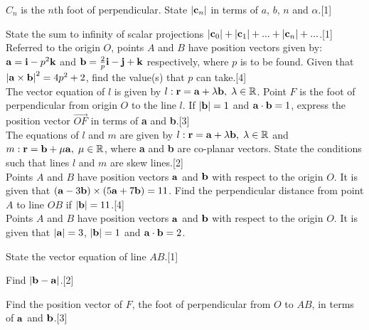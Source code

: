 \documentclass[12pt, a4 paper]{article}
\begin{document}
\begin{outline}[enumerate]
	\2 ${C_n}$ is the $n$th foot of perpendicular. State $\left| {{{\bf{c}}_n}} \right|$ in terms of $a$, $b$, $n$ and $\alpha$.\hfill[1]
		
	\2 State the sum to infinity of scalar projections $\left| {{{\bf{c}}_0}} \right| + \left| {{{\bf{c}}_1}} \right| + ... + \left| {{{\bf{c}}_n}} \right| + ...$.\hfill[1]\\
	
	\1 Referred to the origin $O$, points $A$ and $B$ have position vectors given by: ${\bf{a}} = {\bf{i}} - {p^2}{\bf{k}}$ and ${\bf{b}} = \frac{2}{p}{\bf{i}} - {\bf{j}} + {\bf{k}}$ respectively, where $p$ is to be found. Given that ${\left| {{\bf{a}} \times {\bf{b}}} \right|^2} = 4{p^2} + 2$, find the value(s) that $p$ can take.\hfill[4]\\
	
	\1 The vector equation of $l$ is given by $l:{\bf{r}} = {\bf{a}} + \lambda {\bf{b}},\;\lambda  \in \mathbb{R}$. Point $F$ is the foot of perpendicular from origin $O$ to the line $l$. If $\left| {\bf{b}} \right| = 1$ and ${\bf{a}} \cdot {\bf{b}} = 1$, express the position vector $\overrightarrow {OF}$ in terms of \textbf{a} and \textbf{b}.\hfill[3]\\
	
	\1 The equations of $l$ and $m$ are given by $l:{\bf{r}} = {\bf{a}} + \lambda {\bf{b}},\;\lambda  \in \mathbb{R}$ and $m:{\bf{r}} = {\bf{b}} + \mu {\bf{a}},\;\mu  \in \mathbb{R}$, where \textbf{a} and \textbf{b} are co-planar vectors. State the conditions such that lines $l$ and $m$ are skew lines.\hfill[2]\\
		
	\1 Points $A$ and $B$ have position vectors $\bf{a}$ and $\bf{b}$ with respect to the origin $O$. It is given that $({\bf{a}} - 3{\bf{b}}) \times (5{\bf{a}} + 7{\bf{b}}) = 11$. Find the perpendicular distance from point $A$ to line $OB$ if $\left| {\bf{b}} \right| = 11$.\hfill[4]\\
	
	\1 Points $A$ and $B$ have position vectors $\bf{a}$ and $\bf{b}$ with respect to the origin $O$. It is given that $\left| {\bf{a}} \right| = 3$, $\left| {\bf{b}} \right| = 1$ and ${\bf{a}} \cdot {\bf{b}} = 2$.
	    
	\2 State the vector equation of line $AB$.\hfill[1]
							        
	\2 Find $\left| {{\bf{b}} - {\bf{a}}} \right|$.\hfill[2]
							        
	\2 Find the position vector of $F$, the foot of perpendicular from $O$ to $AB$, in terms of $\bf{a}$ and $\bf{b}$.\hfill[3]
		

\end{outline}
\end{document}
